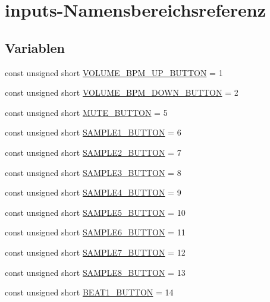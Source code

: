 \hypertarget{namespaceinputs}{}\section{inputs-\/\+Namensbereichsreferenz}
\label{namespaceinputs}
\subsection*{Variablen}
\begin{DoxyCompactItemize}
\item 
const unsigned short \hyperlink{namespaceinputs_ab1d58fe937ccabff6ec4011a74028bfb}{V\+O\+L\+U\+M\+E\+\_\+\+B\+P\+M\+\_\+\+U\+P\+\_\+\+B\+U\+T\+T\+ON} = 1
\item 
const unsigned short \hyperlink{namespaceinputs_af3cad6ab00b2670e1710698945d28c17}{V\+O\+L\+U\+M\+E\+\_\+\+B\+P\+M\+\_\+\+D\+O\+W\+N\+\_\+\+B\+U\+T\+T\+ON} = 2
\item 
const unsigned short \hyperlink{namespaceinputs_af0075a72395787966efcec2403306b43}{M\+U\+T\+E\+\_\+\+B\+U\+T\+T\+ON} = 5
\item 
const unsigned short \hyperlink{namespaceinputs_a39dbaf6935309e198c1a0bc6e3468c45}{S\+A\+M\+P\+L\+E1\+\_\+\+B\+U\+T\+T\+ON} = 6
\item 
const unsigned short \hyperlink{namespaceinputs_afcf2086c7f58f801e5654d8e573d928c}{S\+A\+M\+P\+L\+E2\+\_\+\+B\+U\+T\+T\+ON} = 7
\item 
const unsigned short \hyperlink{namespaceinputs_a17158d35ca30fb91c6f9f757ce0d7ccc}{S\+A\+M\+P\+L\+E3\+\_\+\+B\+U\+T\+T\+ON} = 8
\item 
const unsigned short \hyperlink{namespaceinputs_ac9ccac580f0955e454a367ddc6421d78}{S\+A\+M\+P\+L\+E4\+\_\+\+B\+U\+T\+T\+ON} = 9
\item 
const unsigned short \hyperlink{namespaceinputs_ad22ade847b4a38fd418dccda07814551}{S\+A\+M\+P\+L\+E5\+\_\+\+B\+U\+T\+T\+ON} = 10
\item 
const unsigned short \hyperlink{namespaceinputs_a88edcfa8b89df1abcca33bcec05974c4}{S\+A\+M\+P\+L\+E6\+\_\+\+B\+U\+T\+T\+ON} = 11
\item 
const unsigned short \hyperlink{namespaceinputs_a50972dcf524a7b7c420ca75b0ba72a29}{S\+A\+M\+P\+L\+E7\+\_\+\+B\+U\+T\+T\+ON} = 12
\item 
const unsigned short \hyperlink{namespaceinputs_a85f389284c616cd584390d04ad192ced}{S\+A\+M\+P\+L\+E8\+\_\+\+B\+U\+T\+T\+ON} = 13
\item 
const unsigned short \hyperlink{namespaceinputs_af62021422f469c370f42c78a72504a66}{B\+E\+A\+T1\+\_\+\+B\+U\+T\+T\+ON} = 14

\end{DoxyCompactItemize}
